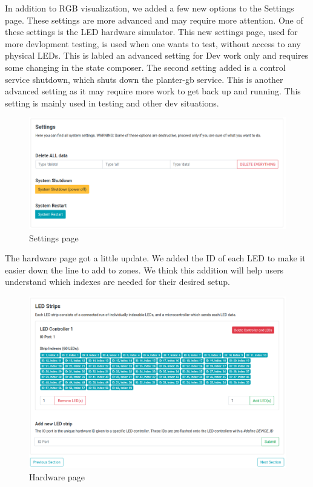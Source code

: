 \documentclass[onecolumn, draftclsnofoot,10pt, compsoc]{IEEEtran}
\begin{document}
		\noindent In addition to RGB visualization, we added a few new options to the Settings page. These settings are more advanced and may require more attention.
		One of these settings is the LED hardware simulator. This new settings page, used for more devlopment testing, is used when one wants to test, without
		access to any physical LEDs. This is labled an advanced setting for Dev work only and requires some changing in the state composer. The second setting added is a control
		service shutdown, which shuts down the planter-gb service. This is another advanced setting as it may require more work to get back up and running.
		This setting is mainly used in testing and other dev situations.
		\begin{center}
			\begin{figure}[H]
				\includegraphics[width=\linewidth]{site/settings.png}
				\caption{Settings page}
				\label{fig:siteSettings}
			\end{figure}
		\end{center}
		\noindent The hardware page got a little update. We added the ID of each LED to make it easier down the line to add to zones. We think this addition
		will help users understand which indexes are needed for their desired setup.
		\begin{center}
			\begin{figure}[H]
				\includegraphics[width=\linewidth]{site/hardware.png}
				\caption{Hardware page}
				\label{fig:siteHardware}
			\end{figure}
		\end{center}
\end{document}
